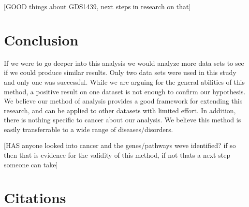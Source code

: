 \documentclass[preprint,10pt]{elsarticle}
\begin{document}
	[GOOD things about GDS1439, next steps in research on that]


\section{Conclusion}


If we were to go deeper into this analysis we would analyze more data sets to see if we could produce similar results. Only two data sets were used in this study and only one was successful. While we are arguing for the general abilities of this method, a positive result on one dataset is not enough to confirm our hypothesis. We believe our method of analysis provides a good framework for extending this research, and can be applied to other datasets with limited effort. In addition, there is nothing specific to cancer about our analysis. We believe this method is easily transferrable to a wide range of diseases/disorders. 

[HAS anyone looked into cancer and the genes/pathways weve identified? if so then that is evidence for the validity of this method, if not thats a next step someone can take]





\section{Citations}
\end{document}

